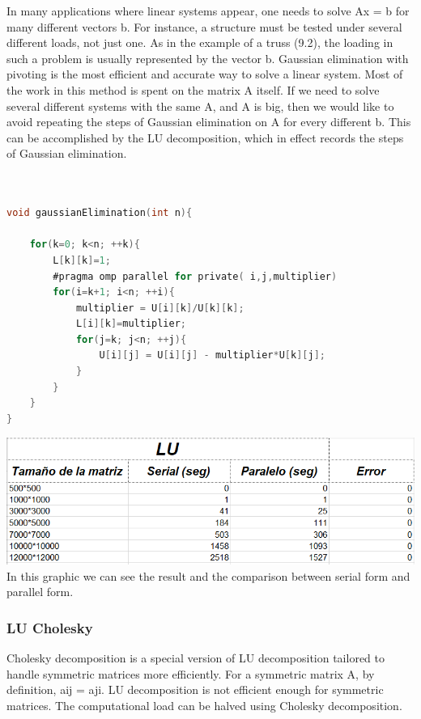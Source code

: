 \documentclass{article}
\newcounter{subsubsubsection}[subsubsection]
\begin{document}
In many applications where linear systems appear, one needs to solve Ax = b for many different vectors b.
For instance, a structure must be tested under several different loads, not just one. As in the example of a
truss (9.2), the loading in such a problem is usually represented by the vector b. Gaussian elimination with
pivoting is the most efficient and accurate way to solve a linear system. Most of the work in this method is
spent on the matrix A itself. If we need to solve several different systems with the same A, and A is big,
then we would like to avoid repeating the steps of Gaussian elimination on A for every different b. This can
be accomplished by the LU decomposition, which in effect records the steps of Gaussian elimination.




\begin{lstlisting}[language=C]


void gaussianElimination(int n){
	
	for(k=0; k<n; ++k){
		L[k][k]=1;
        #pragma omp parallel for private( i,j,multiplier) 
		for(i=k+1; i<n; ++i){
			multiplier = U[i][k]/U[k][k];
			L[i][k]=multiplier;
			for(j=k; j<n; ++j){
				U[i][j] = U[i][j] - multiplier*U[k][j];
			}
		}
	}
}

\end{lstlisting}



\includegraphics[width=\linewidth]{./images/lu.PNG}\\
In this graphic we can see the result and the comparison between serial form and parallel form.


\subsubsection{LU Cholesky}


Cholesky decomposition is a special version of LU decomposition tailored to handle symmetric
matrices more efficiently.
For a symmetric matrix A, by definition, aij = aji. LU decomposition is not efficient enough
for symmetric matrices. The computational load can be halved using Cholesky decomposition.
\end{document}
